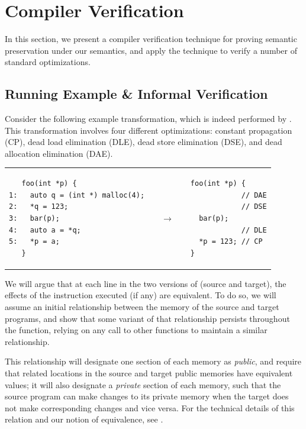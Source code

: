 \section{Compiler Verification}
\label{sec:intptrcast:compiler-verification}

In this section, we present a compiler verification technique for proving semantic preservation
under our semantics, and apply the technique to verify a number of standard optimizations.



\subsection{Running Example \& Informal Verification}
\label{reasoning:running}

Consider the following example transformation, which is indeed performed by .  This
transformation involves four different optimizations: constant propagation (CP), dead load
elimination (DLE), dead store elimination (DSE), and dead allocation elimination (DAE).
\begin{center}
\begin{tabular}{@{}l@{}l@{}l@{}}
\begin{minipage}{0.5\textwidth}
\begin{verbatim}
   foo(int *p) {
1:   auto q = (int *) malloc(4);
2:   *q = 123;
3:   bar(p);
4:   auto a = *q;
5:   *p = a;
   }
\end{verbatim}
\end{minipage}
&
$\quad\rightarrow\quad$
&
\begin{minipage}{0.3\textwidth}
\begin{verbatim}
foo(int *p) {
            // DAE
            // DSE
  bar(p);
            // DLE
  *p = 123; // CP
}
\end{verbatim}
\end{minipage}
\end{tabular}
\end{center}

We will argue that at each line in the two versions of  (source and target), the effects
of the instruction executed (if any) are equivalent. To do so, we will assume an initial
relationship between the memory of the source and target programs, and show that some variant of
that relationship persists throughout the function, relying on any call to other functions to
maintain a similar relationship.

This relationship will designate one section of each memory as \emph{public}, and require that
related locations in the source and target public memories have equivalent values; it will also
designate a \emph{private} section of each memory, such that the source program can make changes to
its private memory when the target does not make corresponding changes and vice versa.  For the
technical details of this relation and our notion of equivalence, see .

